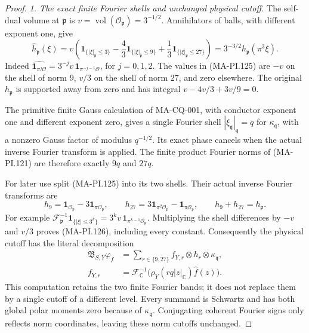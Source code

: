 \begin{proof}
\emph{1. The exact finite Fourier shells and unchanged physical cutoff.}
The self-dual volume at $\mathfrak p$ is
$v=\operatorname{vol}(\mathcal O_{\mathfrak p})=3^{-1/2}$.
Annihilators of balls, with different exponent one, give
\[
 \widehat h_{\mathfrak p}(\xi)
   =v\left(\mathbf1_{\{|\xi|_{\mathfrak p}\le3\}}
       -\frac43\mathbf1_{\{|\xi|_{\mathfrak p}\le9\}}
       +\frac13\mathbf1_{\{|\xi|_{\mathfrak p}\le27\}}\right)
   =3^{-3/2}h_{\mathfrak p}(\pi^3\xi).
 \tag{MA-PI.125}
\]
Indeed $\widehat{\mathbf1_{\pi^j\mathcal O}}=
3^{-j}v\,\mathbf1_{\pi^{-j-1}\mathcal O}$, for $j=0,1,2$.
The values in (MA-PI.125) are $-v$ on the shell of norm
$9$, $v/3$ on the shell of norm $27$, and zero elsewhere.
The original $h_{\mathfrak p}$ is supported away from zero
and has integral $v-4v/3+3v/9=0$.

The primitive finite Gauss calculation of MA-CQ-001,
with conductor exponent one and different exponent zero,
gives a single Fourier shell
$|\xi_{\mathfrak q}|_{\mathfrak q}=q$ for
$\kappa_{\mathfrak q}$, with a nonzero Gauss factor of
modulus $q^{-1/2}$.  Its exact phase cancels when the
actual inverse Fourier transform is applied.
The finite product Fourier norms of (MA-PI.121) are
therefore exactly $9q$ and $27q$.

For later use split (MA-PI.125) into its two shells.
Their actual inverse Fourier transforms are
\[
 h_9=\mathbf1_{\mathcal O_{\mathfrak p}}
                  -3\mathbf1_{\pi\mathcal O_{\mathfrak p}},
 \qquad
 h_{27}=3\mathbf1_{\pi^2\mathcal O_{\mathfrak p}}
                  -\mathbf1_{\pi\mathcal O_{\mathfrak p}},
 \qquad h_9+h_{27}=h_{\mathfrak p}.
 \tag{MA-PI.126}
\]
For example
$\mathcal F_{\mathfrak p}^{-1}\mathbf1_{\{|\xi|\le3^k\}}
 =3^kv\,\mathbf1_{\pi^{k-1}\mathcal O_{\mathfrak p}}$.
Multiplying the shell differences by $-v$ and $v/3$
proves (MA-PI.126), including every constant.
Consequently the physical cutoff has the literal decomposition
\[
 \begin{split}
 \mathfrak B_{S,Y}\varphi_f
   &=\sum_{r\in\{9,27\}}
          f_{Y,r}\otimes h_r\otimes\kappa_{\mathfrak q},\\
 f_{Y,r}
   &=\mathcal F_{\mathbb C}^{-1}
           \bigl(\rho_Y(rq|z|_{\mathbb C})\widehat f(z)\bigr).
 \end{split}
 \tag{MA-PI.127}
\]
This computation retains the two finite Fourier bands;
it does not replace them by a single cutoff of a different
level.  Every summand is Schwartz and has both global
polar moments zero because of $\kappa_{\mathfrak q}$.
Conjugating coherent Fourier signs only reflects norm
coordinates, leaving these norm cutoffs unchanged.


\end{proof}
